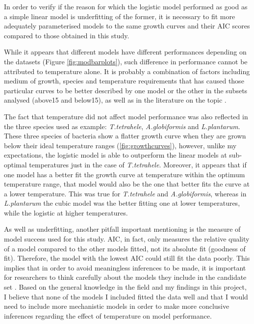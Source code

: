 \documentclass[a4paper]{article}
\begin{document}
In order to verify if the reason for which the logistic model performed as good as a simple linear model is underfitting of the former, it is necessary to fit more adequately parameterised models to the same growth curves and their AIC scores compared to those obtained in this study. \par

While it appears that different models have different performances depending on the datasets (Figure \ref{fig:modbarplots}), such difference in performance cannot be attributed to temperature alone. It is probably a combination of factors including medium of growth, species and temperature requirements that has caused those particular curves to be better described by one model or the other in the subsets analysed (above15 and below15), as well as in the literature on the topic \citep{pla2015comparison}.\par

The fact that temperature did not affect model performance was also reflected in the three species used as example: \textit{T.tetrahele}, \textit{A.globiformis} and \textit{L.plantarum}. These three species of bacteria show a flatter growth curve when they are grown below their ideal temperature ranges (\ref{fig:growthcurves}), however, unlike my expectations, the logistic model is able to outperform the linear models at sub-optimal temperatures just in the case of \textit{T.tetrahele}. Moreover, it appears that if one model has a better fit the growth curve at temperature within the optimum temperature range, that model would also be the one that better fits the curve at a lower temperature. This was true for \textit{T.tetrahele} and \textit{A.globiformis}, whereas in \textit{L.plantarum} the cubic model was the better fitting one at lower temperatures, while the logistic at higher temperatures. \par

As well as underfitting, another pitfall important mentioning is the measure of model success used for this study. AIC, in fact, only measures the relative quality of a model compared to the other models fitted, not its absolute fit (goodness of fit). Therefore, the model with the lowest AIC could still fit the data poorly. This implies that in order to avoid meaningless inferences to be made, it is important for researchers to think carefully about the models they include in the candidate set \citep{johnson2004model}. Based on the general knowledge in the field and my findings in this project, I believe that none of the models I included fitted the data well and that I would need to include more mechanistic models in order to make more conclusive inferences regarding the effect of temperature on model performance. \par
\end{document}
